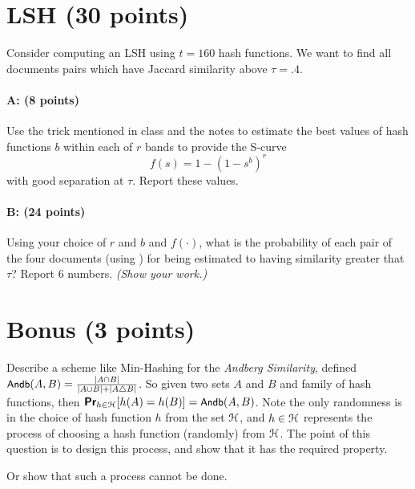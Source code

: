 \documentclass[11pt]{article}
\newcommand{\Andb}{\ensuremath{\textsf{\small Andb}}}
\begin{document}
\section{LSH (30 points)}

Consider computing an LSH using $t = 160$ hash functions.  We want to find all documents pairs which have Jaccard similarity above $\tau = .4$.  

\paragraph{A: (8 points)} 
Use the trick mentioned in class and the notes to estimate the best values of hash functions $b$ within each of $r$ bands to provide the S-curve 
\[
f(s) = 1- (1-s^b)^r
\]
with good separation at $\tau$.  Report these values.  

\paragraph{B: (24 points)}
Using your choice of $r$ and $b$ and $f(\cdot)$, what is the probability of each pair of the four documents (using \s{[G2]}) for being estimated to having similarity greater that $\tau$?  
Report $6$ numbers.  
\emph{(Show your work.)}


\section{Bonus (3 points)}

Describe a scheme like Min-Hashing for the \emph{Andberg Similarity}, defined $\Andb(A,B) = \frac{|A \cap B|}{|A \cup B| + |A \triangle B|}$.  So given two sets $A$ and $B$ and family of hash functions, then $\Pr_{h \in \Eu{H}}[h(A) = h(B)] = \Andb(A,B)$.  Note the only randomness is in the choice of hash function $h$ from the set $\EuScript{H}$, and $h \in \EuScript{H}$ represents the process of choosing a hash function (randomly) from $\EuScript{H}$.  The point of this question is to design this process, and show that it has the required property.  

Or show that such a process cannot be done.  
\end{document}

